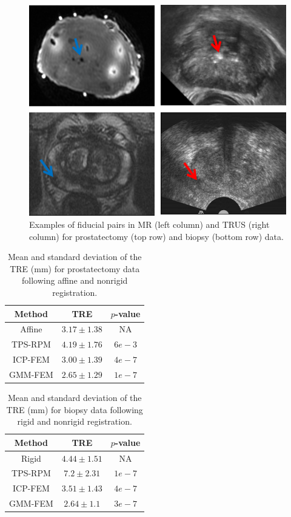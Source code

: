 \documentclass[journal]{IEEEtran}
\begin{document}
\begin{figure}[t]
	\centering
	\includegraphics[width=\columnwidth]{FiducialPair}
	\caption{Examples of fiducial pairs in MR (left column) and TRUS (right column) for prostatectomy (top row) and biopsy (bottom row) data. \label{fig:exp2fiducial1}}
\end{figure}
\begin{table}[tb]
\begin{center}
\caption{Mean and standard deviation of the TRE (mm) for prostatectomy data following affine and nonrigid registration.}
\centering
\begin{tabular}{c| c| c}
	\hline
	Method & TRE & $p$-value\\
	\hline
	Affine & $3.17 \pm 1.38$ & NA \\
	\hline
	TPS-RPM & $4.19 \pm 1.76$ & $6e-3$ \\
	\hline
	ICP-FEM & $3.00 \pm 1.39$ & $4e-7$ \\
	\hline
	GMM-FEM & $2.65 \pm 1.29$ & $1e-7$ \\
   \hline
\end{tabular}
\label{tab:exp2Res1}
\end{center}
\end{table}
\begin{table}[tb]
\begin{center}
\caption{Mean and standard deviation of the TRE (mm) for biopsy data following rigid and nonrigid registration.}
\centering
\begin{tabular}{c| c| c}
	\hline
	Method & TRE & $p$-value\\
	\hline
	Rigid & $4.44 \pm 1.51$ & NA \\
	\hline
	TPS-RPM & $7.2 \pm 2.31$ & $1e-7$ \\
	\hline
	ICP-FEM & $3.51 \pm 1.43$ & $4e-7$ \\
	\hline
	GMM-FEM & $2.64 \pm 1.1$ & $3e-7$ \\
   \hline
\end{tabular}
\label{tab:exp1Res1}
\end{center}
\end{table}%
\end{document}
